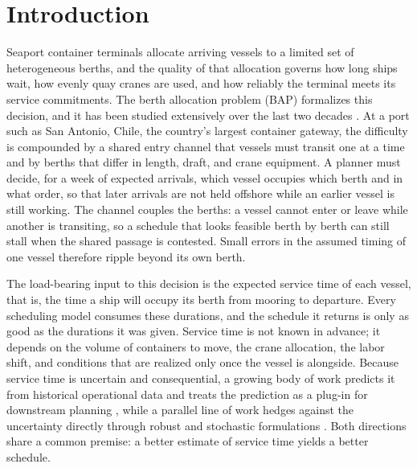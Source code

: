 \section{Introduction}\label{sec:intro}

Seaport container terminals allocate arriving vessels to a limited set of
heterogeneous berths, and the quality of that allocation governs how long ships
wait, how evenly quay cranes are used, and how reliably the terminal meets its
service commitments. The berth allocation problem (BAP) formalizes this
decision, and it has been studied extensively over the last two decades
\citep{bierwirth2010survey}. At a port such as San Antonio, Chile, the country's
largest container gateway, the difficulty is compounded by a shared entry
channel that vessels must transit one at a time and by berths that differ in
length, draft, and crane equipment. A planner must decide, for a week of
expected arrivals, which vessel occupies which berth and in what order, so that
later arrivals are not held offshore while an earlier vessel is still working.
The channel couples the berths: a vessel cannot enter or leave while another is
transiting, so a schedule that looks feasible berth by berth can still stall
when the shared passage is contested. Small errors in the assumed timing of one
vessel therefore ripple beyond its own berth.

The load-bearing input to this decision is the expected service time of each
vessel, that is, the time a ship will occupy its berth from mooring to
departure. Every scheduling model consumes these durations, and the schedule it
returns is only as good as the durations it was given. Service time is not
known in advance; it depends on the volume of containers to move, the crane
allocation, the labor shift, and conditions that are realized only once the
vessel is alongside. Because service time is uncertain and consequential, a
growing body of work predicts it from historical operational data and treats
the prediction as a plug-in for downstream planning
\citep{yan2024predicting,chu2025vessel}, while a parallel line of work hedges
against the uncertainty directly through robust and stochastic formulations
\citep{rodrigues2022uncertainty,kolley2023robust}. Both directions share a
common premise: a better estimate of service time yields a better schedule.


